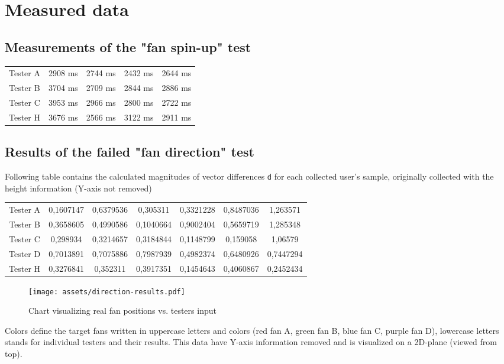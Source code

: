 \chapter{Measured data}

\label{appx:a}
\section*{Measurements of the "fan spin-up" test}

\begin{center}
    \begin{tabular}{|c|c|c|c|c|}
    \hline
    Tester A & 2908 ms & 2744 ms & 2432 ms & 2644 ms \\
    Tester B & 3704 ms & 2709 ms & 2844 ms & 2886 ms \\
    Tester C & 3953 ms & 2966 ms & 2800 ms & 2722 ms \\
    Tester H & 3676 ms & 2566 ms & 3122 ms & 2911 ms \\
    \hline
\end{tabular}
\end{center}

\label{appx:b}
\section*{Results of the failed "fan direction" test}
Following table contains the calculated magnitudes of vector differences \texttt{d}
for each collected user’s sample, originally collected with the
height information (Y-axis not removed)


\begin{center}
\begin{tabular}{|c|c|c|c|c|c|c|}
\hline
Tester A & 0,1607147 & 0,6379536 & 0,305311 & 0,3321228 & 0,8487036 & 1,263571 \\ 
Tester B & 0,3658605 & 0,4990586 & 0,1040664 & 0,9002404 & 0,5659719 & 1,285348 \\ 
Tester C & 0,298934 & 0,3214657 & 0,3184844 & 0,1148799 & 0,159058 & 1,06579 \\ 
Tester D & 0,7013891 & 0,7075886 & 0,7987939 & 0,4982374 & 0,6480926 & 0,7447294 \\ 
Tester H & 0,3276841 & 0,352311 & 0,3917351 & 0,1454643 & 0,4060867 & 0,2452434 \\ 
\hline
\end{tabular}
\end{center}

\begin{figure}[h]{}
\centering\texttt{[image: assets/direction-results.pdf]}
\caption{Chart visualizing real fan positions vs. testers input}
\end{figure}

Colors define the target fans written in uppercase letters and colors
(red fan A, green fan B, blue fan C, purple fan D),
lowercase letters stands for individual testers and their results. This data
have Y-axis information removed and is visualized on a 2D-plane
(viewed from top).